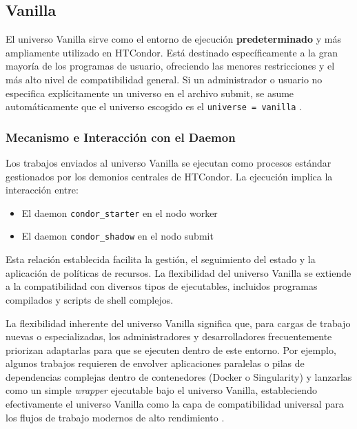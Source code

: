 \subsection{Vanilla}

El universo Vanilla sirve como el entorno de ejecución \textbf{predeterminado} y más ampliamente utilizado en HTCondor. Está destinado específicamente a la gran mayoría de los programas de usuario, ofreciendo las menores restricciones y el más alto nivel de compatibilidad general. Si un administrador o usuario no especifica explícitamente un universo en el archivo submit, se asume automáticamente que el universo escogido es el  \texttt{universe = vanilla} \citep{CERNBatchDocs}.

\subsubsection{Mecanismo e Interacción con el Daemon}

Los trabajos enviados al universo Vanilla se ejecutan como procesos estándar gestionados por los demonios centrales de HTCondor. La ejecución implica la interacción entre:

\begin{itemize}
	\item El daemon \texttt{condor\_starter} en el nodo worker
	\item El daemon \texttt{condor\_shadow} en el nodo submit
\end{itemize}

Esta relación establecida facilita la gestión, el seguimiento del estado y la aplicación de políticas de recursos. La flexibilidad del universo Vanilla se extiende a la compatibilidad con diversos tipos de ejecutables, incluidos programas compilados y scripts de shell complejos.



La flexibilidad inherente del universo Vanilla significa que, para cargas de trabajo nuevas o especializadas, los administradores y desarrolladores frecuentemente priorizan adaptarlas para que se ejecuten dentro de este entorno. Por ejemplo, algunos trabajos requieren de envolver aplicaciones paralelas o pilas de dependencias complejas dentro de contenedores (Docker o Singularity) y lanzarlas como un simple \textit{wrapper} ejecutable bajo el universo Vanilla, estableciendo efectivamente el universo Vanilla como la capa de compatibilidad universal para los flujos de trabajo modernos de alto rendimiento \citep{Emilio_DockerHTCondor, HTCondor_Parallel}.


